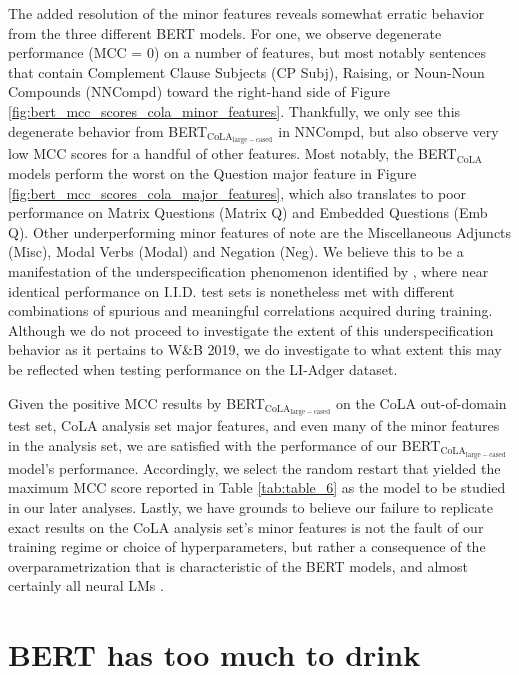 The added resolution of the minor features reveals somewhat erratic behavior from the three different BERT models.  For one, we observe degenerate performance (MCC = 0) on a number of features, but most notably sentences that contain Complement Clause Subjects (CP Subj), Raising, or Noun-Noun Compounds (NNCompd) toward the right-hand side of Figure \ref{fig:bert_mcc_scores_cola_minor_features}.  Thankfully, we only see this degenerate behavior from BERT$_{\mathrm{CoLA_{large-cased}}}$ in NNCompd, but also observe very low MCC scores for a handful of other features.  Most notably, the BERT$_{\mathrm{CoLA}}$ models perform the worst on the Question major feature in Figure \ref{fig:bert_mcc_scores_cola_major_features}, which also translates to poor performance on Matrix Questions (Matrix Q) and Embedded Questions (Emb Q).  Other underperforming minor features of note are the  Miscellaneous Adjuncts (Misc), Modal Verbs (Modal) and Negation (Neg).  We believe this to be a manifestation of the underspecification phenomenon identified by \citet{d2020underspecification}, where near identical performance on I.I.D. test sets is nonetheless met with different combinations of spurious and meaningful correlations acquired during training.  Although we do not proceed to investigate the extent of this underspecification behavior as it pertains to W\&B 2019, we do investigate to what extent this may be reflected when testing performance on the LI-Adger dataset.

Given the positive MCC results by BERT$_\mathrm{CoLA_{large-cased}}$ on the CoLA out-of-domain test set, CoLA analysis set major features, and even many of the minor features in the analysis set, we are satisfied with the performance of our BERT$_\mathrm{CoLA_{large-cased}}$ model's performance.  Accordingly, we select the random restart that yielded the maximum MCC score reported in Table \ref{tab:table_6} as the model to be studied in our later analyses.  Lastly, we have grounds to believe our failure to replicate exact results on the CoLA analysis set's minor features is not the fault of our training regime or choice of hyperparameters, but rather a consequence of the overparametrization that is characteristic of the BERT models, and almost certainly all neural LMs \citep{d2020underspecification}.

\section{BERT has too much to drink}
\label{section:bert_instability}


